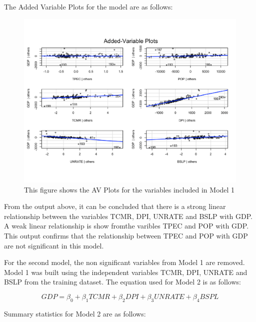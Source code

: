 \documentclass[12pt]{article}
\begin{document}
The Added Variable Plots for the model are as follows:

\begin{figure}[H]
  \centering
  \includegraphics[scale = .5]{AVP1}
  \caption{This figure shows the AV Plots for the variables included in Model 1}
\end{figure}

From the output above, it can be concluded that there is a strong linear relationship between the variables TCMR, DPI, UNRATE and BSLP with GDP.
A weak linear relationship is show fromthe varibles TPEC and POP with GDP. 
This output confirms that the relationship between TPEC and POP with GDP are not significant in this model. 



For the second model, the non significant variables from Model 1 are removed. 
Model 1 was built using the independent variables TCMR, DPI, UNRATE and BSLP from the training dataset. 
The equation used for Model 2 is as follows:

\begin{equation}
  GDP = \beta_0 + \beta_1TCMR+ \beta_2 DPI + \beta_3 UNRATE + \beta_4 BSPL
\end{equation}

Summary statistics for Model 2 are as follows:
\end{document}
